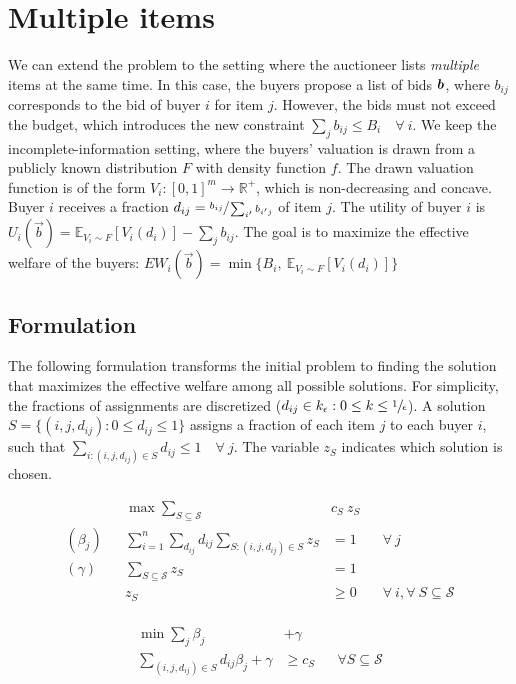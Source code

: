 \section{Multiple items}


We can extend the problem to the setting where the auctioneer lists \emph{multiple} items at the same time. In this case, the buyers propose a list of bids $\bm{b}$, where $b_{ij}$ corresponds to the bid of buyer $i$ for item $j$. However, the bids must not exceed the budget, which introduces the new constraint $\sum_{j} b_{ij} \le B_i \quad \forall\ i$. We keep the incomplete-information setting, where the buyers' valuation is drawn from a publicly known distribution $F$ with density function $f$. The drawn valuation function is of the form $V_{i} : [0,1]^m \rightarrow \mathbb{R}^+$, which is non-decreasing and concave. Buyer $i$ receives a fraction $d_{ij} = \sfrac{b_{ij}}{\sum_{i'} b_{i'j}}$ of item $j$. The utility of buyer $i$ is $U_i(\vec{b}) = \mathbb{E}_{V_{i} \sim F}[V_{i}(d_{i})] - \sum_{j} b_{ij}$. The goal is to maximize the effective welfare of the buyers: $EW_i(\vec{b}) = \min\{B_i,\  \mathbb{E}_{V_{i} \sim F}[V_{i}(d_{i})]\}$

\subsection{Formulation}

The following formulation transforms the initial problem to finding the solution that maximizes the effective welfare among all possible solutions. For simplicity, the fractions of assignments are discretized ($d_{ij} \in k_{\epsilon} : 0 \le k \le \sfrac{1}{\epsilon}$). A solution $S = \{(i, j, d_{ij}) : 0 \le d_{ij} \le 1\}$ assigns a fraction of each item $j$ to each buyer $i$, such that $\sum_{i : (i,j,d_{ij}) \in S} d_{ij} \le 1 \quad \forall\ j$. The variable $z_S$ indicates which solution is chosen.

\begin{minipage}[t]{0.59\textwidth}
	\begin{align*}
		&& \max  \sum_{S \subseteq \mathcal{S}} &c_{S}\ z_{S} \\
		(\beta_j) && \sum_{i=1}^{n} \sum_{d_{ij}} d_{ij} \sum_{S: (i,j,d_{ij}) \in S } z_{S} &= 1 & & \forall \ j\\
		(\gamma) && \sum_{S \subseteq \mathcal{S}} z_{S}  &= 1	& & \\
		&& z_{S} &\geq 0 & & \forall\ i, \forall\ S \subseteq \mathcal{S}\\
	\end{align*}
\end{minipage}
\begin{minipage}[t]{0.3\textwidth}
	\begin{align*}
		\min \sum_{j} \beta_j &+ \gamma \\
		\sum_{(i,j,d_{ij}) \in S} d_{ij} \beta_j + \gamma &\geq c_{S}  & & \forall S \subseteq \mathcal{S}\\
\end{align*}
\end{minipage}

